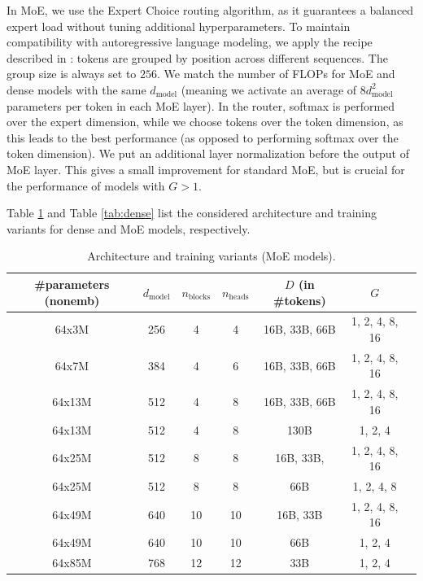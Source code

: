 \documentclass{article} %
\theoremstyle{plain}
\theoremstyle{definition}
\theoremstyle{remark}
\newcommand{\dmodel}{d_\text{model}}
\newcommand{\nblocks}{n_\text{blocks}}
\newcommand{\nheads}{n_\text{heads}}
\begin{document}
In MoE, we use the Expert Choice routing algorithm, as it guarantees a balanced expert load without tuning additional hyperparameters. To maintain compatibility with autoregressive language modeling, we apply the recipe described in \cite{zhou2022mixtureofexperts}: tokens are grouped by position across different sequences. The group size is always set to $256.$ We match the number of FLOPs for MoE and dense models with the same $\dmodel$ (meaning we activate an average of $8\dmodel^2$ parameters per token in each MoE layer). In the router, softmax is performed over the expert dimension, while we choose tokens over the token dimension, as this leads to the best performance (as opposed to performing softmax over the token dimension). We put an additional layer normalization before the output of MoE layer. This gives a small improvement for standard MoE, but is crucial for the performance of models with $G>1.$

Table \ref{tab:moe} and Table \ref{tab:dense} list the considered architecture and training variants for dense and MoE models, respectively. 

\begin{table}[h] 
    \centering
    \caption{Architecture and training variants (MoE models).}
    \vspace{0.4cm}
    \begin{tabular}{ccccccc}
    \toprule
        \#parameters (nonemb) & $\dmodel$ & $\nblocks$ & $\nheads$ & $D$ (in \#tokens) & $G$\\
        \midrule
        64x3M  & 256 & 4 & 4 & 16B, 33B, 66B & 1, 2, 4, 8, 16  \\
        64x7M & 384 & 4 & 6 & 16B, 33B, 66B & 1, 2, 4, 8, 16 \\
        64x13M & 512 & 4 & 8 & 16B, 33B, 66B & 1, 2, 4, 8, 16 \\
        64x13M & 512 & 4 & 8 & 130B & 1, 2, 4 \\
        64x25M & 512 & 8 & 8 & 16B, 33B, & 1, 2, 4, 8, 16 \\
        64x25M & 512 & 8 & 8 & 66B & 1, 2, 4, 8 \\
        64x49M & 640 & 10 & 10 & 16B, 33B & 1, 2, 4, 8, 16 \\
        64x49M & 640 & 10 & 10 & 66B & 1, 2, 4 \\
        64x85M & 768 & 12 & 12 & 33B & 1, 2, 4 \\ \bottomrule
    \end{tabular}
    \label{tab:moe}
\end{table}
\end{document}
